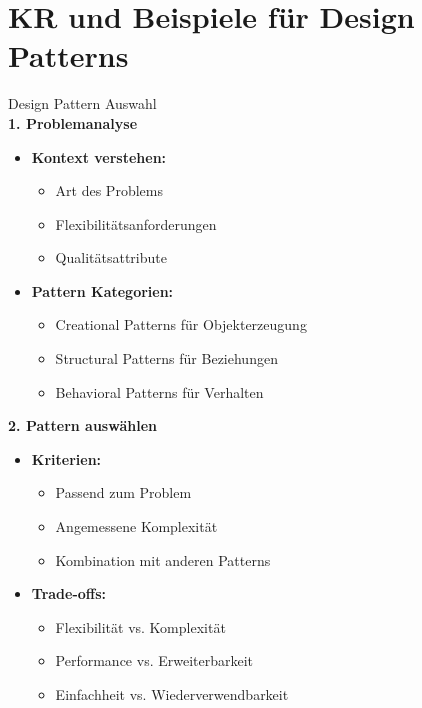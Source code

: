 \section{KR und Beispiele für Design Patterns}

\begin{KR}{Design Pattern Auswahl}\\
\textbf{1. Problemanalyse}
\begin{itemize}
    \item \textbf{Kontext verstehen:}
    \begin{itemize}
        \item Art des Problems
        \item Flexibilitätsanforderungen
        \item Qualitätsattribute
    \end{itemize}
    
    \item \textbf{Pattern Kategorien:}
    \begin{itemize}
        \item Creational Patterns für Objekterzeugung
        \item Structural Patterns für Beziehungen
        \item Behavioral Patterns für Verhalten
    \end{itemize}
\end{itemize}

\textbf{2. Pattern auswählen}
\begin{itemize}
    \item \textbf{Kriterien:}
    \begin{itemize}
        \item Passend zum Problem
        \item Angemessene Komplexität
        \item Kombination mit anderen Patterns
    \end{itemize}
    
    \item \textbf{Trade-offs:}
    \begin{itemize}
        \item Flexibilität vs. Komplexität
        \item Performance vs. Erweiterbarkeit
        \item Einfachheit vs. Wiederverwendbarkeit
    \end{itemize}
\end{itemize}
\end{KR}

